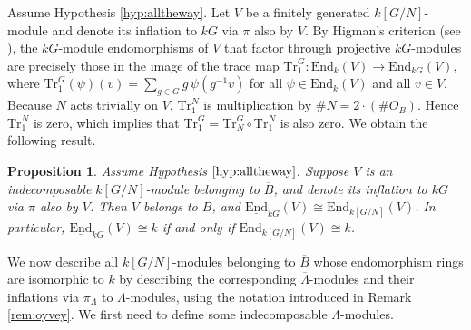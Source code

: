 \documentclass{amsart}
\theoremstyle{plain}
\newtheorem{prop}[thm]{Proposition}
\theoremstyle{definition}
\theoremstyle{remark}
\begin{document}
Assume Hypothesis \ref{hyp:alltheway}.
Let $V$ be a finitely generated $k[G/N]$-module and
denote its inflation to $kG$ via $\pi$ also by $V$. By Higman's criterion 
(see \cite[Thm. 1]{higman}), the $kG$-module endomorphisms of $V$ that
factor through projective $kG$-modules are precisely those in the image of the trace map
$\mathrm{Tr}_1^G:\mathrm{End}_k(V)\to \mathrm{End}_{kG}(V)$, where 
$\mathrm{Tr}_1^G(\psi)(v)=\sum_{g\in G}g\,\psi(g^{-1}v)$ for all $\psi\in\mathrm{End}_k(V)$
and all $v\in V$. Because $N$ acts trivially on $V$, $\mathrm{Tr}_1^N$ is multiplication by 
$\#N = 2\cdot (\# O_B)$. Hence $\mathrm{Tr}_1^N$ is zero, which implies that 
$\mathrm{Tr}_1^G=\mathrm{Tr}_N^G\circ \mathrm{Tr}_1^N$ is also zero. 
We obtain the following result.

\begin{prop}
\label{prop:stablend}
Assume Hypothesis $\ref{hyp:alltheway}$.
Suppose $V$ is an indecomposable $k[G/N]$-module belonging to $\overline{B}$,
and denote its inflation to $kG$ via $\pi$ also by $V$. Then $V$ belongs to $B$, and
$\underline{\mathrm{End}}_{kG}(V)\cong \mathrm{End}_{k[G/N]}(V)$.
In particular, $\underline{\mathrm{End}}_{kG}(V)\cong k$ if and only if          
$\mathrm{End}_{k[G/N]}(V)\cong k$. 
\end{prop}

We now describe all $k[G/N]$-modules belonging to $\overline{B}$ whose endomorphism rings
are isomorphic to $k$ by describing the corresponding $\overline{\Lambda}$-modules and their
inflations via $\pi_\Lambda$ to $\Lambda$-modules, using the notation introduced in Remark \ref{rem:oyvey}.
We first need to define some indecomposable $\Lambda$-modules.
\end{document}
